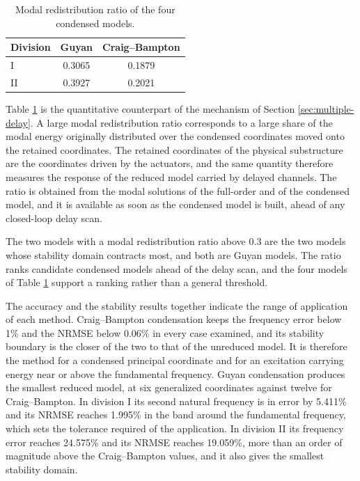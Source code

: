 \documentclass[a4paper,fleqn,review,12pt]{cas-sc}
\numberwithin{equation}{section}
\begin{document}
\begin{table}[htbp]
	\centering
	\caption{Modal redistribution ratio of the four condensed models.}
	\label{tab:energy}
	\begin{tabular}{lcc}
		\toprule
		Division & Guyan & Craig--Bampton\\
		\midrule
		I  & 0.3065 & 0.1879\\
		II & 0.3927 & 0.2021\\
		\bottomrule
	\end{tabular}
\end{table}

Table \ref{tab:energy} is the quantitative counterpart of the mechanism of Section \ref{sec:multiple-delay}. A large modal redistribution ratio corresponds to a large share of the modal energy originally distributed over the condensed coordinates moved onto the retained coordinates. The retained coordinates of the physical substructure are the coordinates driven by the actuators, and the same quantity therefore measures the response of the reduced model carried by delayed channels. The ratio is obtained from the modal solutions of the full-order and of the condensed model, and it is available as soon as the condensed model is built, ahead of any closed-loop delay scan.

The two models with a modal redistribution ratio above 0.3 are the two models whose stability domain contracts most, and both are Guyan models. The ratio ranks candidate condensed models ahead of the delay scan, and the four models of Table \ref{tab:energy} support a ranking rather than a general threshold.

The accuracy and the stability results together indicate the range of application of each method. Craig--Bampton condensation keeps the frequency error below 1\% and the NRMSE below 0.06\% in every case examined, and its stability boundary is the closer of the two to that of the unreduced model. It is therefore the method for a condensed principal coordinate and for an excitation carrying energy near or above the fundamental frequency. Guyan condensation produces the smallest reduced model, at six generalized coordinates against twelve for Craig--Bampton. In division I its second natural frequency is in error by 5.411\% and its NRMSE reaches 1.995\% in the band around the fundamental frequency, which sets the tolerance required of the application. In division II its frequency error reaches 24.575\% and its NRMSE reaches 19.059\%, more than an order of magnitude above the Craig--Bampton values, and it also gives the smallest stability domain.
\end{document}
